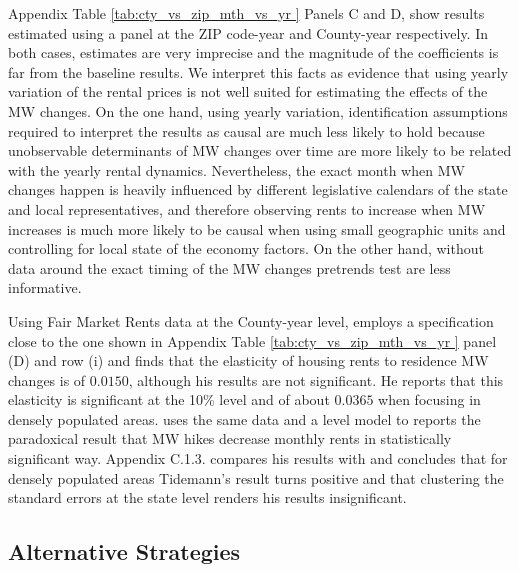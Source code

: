 Appendix Table \ref{tab:cty_vs_zip_mth_vs_yr } Panels C and D, show results estimated
using a panel at the ZIP code-year and County-year respectively. In both cases, estimates
are very imprecise and the magnitude of the coefficients is far from the baseline results. 
We interpret this facts as evidence that using yearly variation of the rental prices is not 
well suited for estimating the effects of the MW changes. On the one hand, using yearly variation, 
identification assumptions required to interpret the results as causal are much less likely 
to hold because unobservable determinants of MW changes over time are more likely to be 
related with the yearly rental dynamics. Nevertheless, the exact month when MW changes 
happen is heavily influenced by different legislative calendars of the state and local 
representatives, and therefore observing rents to increase when MW increases is much 
more likely to be causal when using small geographic units and controlling for local 
state of the economy factors. On the other hand, without data around the exact timing of the 
MW changes pretrends test are less informative.

Using Fair Market Rents data at the County-year level, \textcite{Yamagishi2019} employs a 
specification close to the one shown in Appendix Table \ref{tab:cty_vs_zip_mth_vs_yr } 
panel (D) and row (i) and finds that the elasticity of housing rents to residence MW changes 
is of $0.0150$, although his results are not significant. He reports that this elasticity is 
significant at the 10\% level and of about $0.0365$ when focusing in densely populated areas.
\textcite{Tidemann2018} uses the same data and a level model to reports the paradoxical 
result that MW hikes decrease monthly rents in statistically significant way. \textcite{Yamagishi2019} 
Appendix C.1.3. compares his results with \textcite{Tidemann2018} and concludes that for densely 
populated areas Tidemann's result turns positive and that clustering the standard errors at the
state level renders his results insignificant.

\subsection{Alternative Strategies}
\label{sec:results_alternative_strategies}

